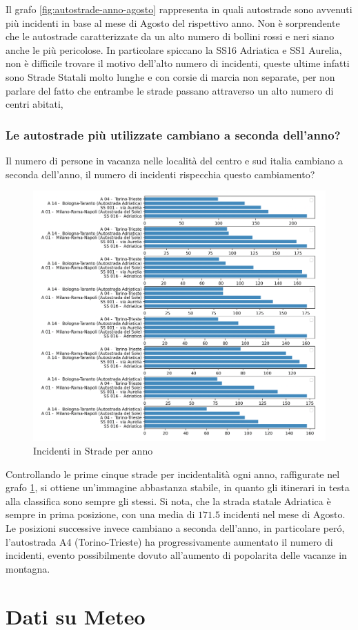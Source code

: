 \documentclass[a4paper]{report}
\begin{document}
Il grafo \ref{fig:autostrade-anno-agosto} rappresenta in quali autostrade sono avvenuti più incidenti in base al mese di Agosto
del rispettivo anno.
Non è sorprendente che le autostrade caratterizzate da un alto numero di bollini rossi e neri 
siano anche le più pericolose.
In particolare spiccano la SS16 Adriatica e SS1 Aurelia, non è difficile trovare il motivo dell'alto numero di incidenti, 
queste ultime infatti sono Strade Statali molto lunghe e con corsie di marcia non separate, 
per non parlare del fatto che entrambe le strade passano attraverso un alto numero di centri abitati, 

\subsection{Le autostrade più utilizzate cambiano a seconda dell'anno?}

Il numero di persone in vacanza nelle località del centro e sud italia cambiano 
a seconda dell'anno, il numero di incidenti rispecchia questo cambiamento?

\begin{figure}
    \includegraphics[width=\linewidth]{../src/incidenti/incidenti_aci/agosto/autostrade.png}
    \caption{Incidenti in Strade per anno}
    \label{fig:autostrade-anno}
\end{figure}

Controllando le prime cinque strade per incidentalità ogni anno, 
raffigurate nel grafo \ref{fig:autostrade-anno}, si ottiene un'immagine 
abbastanza stabile, in quanto gli itinerari in testa alla classifica sono sempre gli stessi.
Si nota, che la strada statale Adriatica è sempre in prima posizione, 
con una media di $171.5$ incidenti nel mese di Agosto.
Le posizioni successive invece cambiano a seconda dell'anno, in particolare per\'o, l'autostrada 
A4 (Torino-Trieste) ha progressivamente aumentato il numero di incidenti, evento possibilmente 
dovuto all'aumento di popolarita delle vacanze in montagna.


\chapter{Dati su Meteo}



\end{document}
